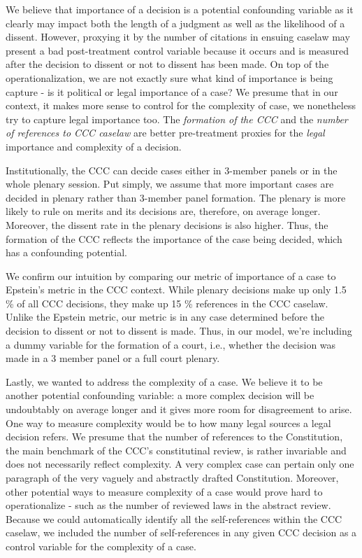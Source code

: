 \documentclass[
  11pt,
]{article}
\begin{document}
We believe that importance of a decision is a potential confounding
variable as it clearly may impact both the length of a judgment as well
as the likelihood of a dissent. However, proxying it by the number of
citations in ensuing caselaw may present a bad post-treatment control
variable because it occurs and is measured after the decision to dissent
or not to dissent has been made. On top of the operationalization, we
are not exactly sure what kind of importance is being capture - is it
political or legal importance of a case? We presume that in our context,
it makes more sense to control for the complexity of case, we
nonetheless try to capture legal importance too. The \emph{formation of
the CCC} and the \emph{number of references to CCC caselaw} are better
pre-treatment proxies for the \emph{legal} importance and complexity of
a decision.

Institutionally, the CCC can decide cases either in 3-member panels or
in the whole plenary session. Put simply, we assume that more important
cases are decided in plenary rather than 3-member panel formation. The
plenary is more likely to rule on merits and its decisions are,
therefore, on average longer. Moreover, the dissent rate in the plenary
decisions is also higher. Thus, the formation of the CCC reflects the
importance of the case being decided, which has a confounding potential.

We confirm our intuition by comparing our metric of importance of a case
to Epstein's metric in the CCC context. While plenary decisions make up
only 1.5 \% of all CCC decisions, they make up 15 \% references in the
CCC caselaw. Unlike the Epstein metric, our metric is in any case
determined before the decision to dissent or not to dissent is made.
Thus, in our model, we're including a dummy variable for the formation
of a court, i.e., whether the decision was made in a 3 member panel or a
full court plenary.

Lastly, we wanted to address the complexity of a case. We believe it to
be another potential confounding variable: a more complex decision will
be undoubtably on average longer and it gives more room for disagreement
to arise. One way to measure complexity would be to how many legal
sources a legal decision refers. We presume that the number of
references to the Constitution, the main benchmark of the CCC's
constitutinal review, is rather invariable and does not necessarily
reflect complexity. A very complex case can pertain only one paragraph
of the very vaguely and abstractly drafted Constitution. Moreover, other
potential ways to measure complexity of a case would prove hard to
operationalize - such as the number of reviewed laws in the abstract
review. Because we could automatically identify all the self-references
within the CCC caselaw, we included the number of self-references in any
given CCC decision as a control variable for the complexity of a case.
\end{document}
